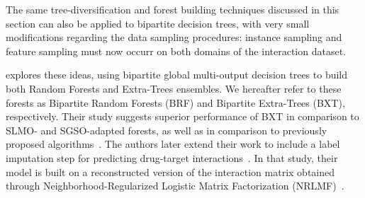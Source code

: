 The same tree-diversification and forest building techniques discussed in this section can also be applied to bipartite decision trees, with very small modifications regarding the data sampling procedures: instance sampling and feature sampling must now occurr on both domains of the interaction dataset.

\cite{pliakos2019network} explores these ideas, using bipartite global multi-output decision trees to build both Random Forests and Extra-Trees ensembles. We hereafter refer to these forests as Bipartite Random Forests (BRF) and Bipartite Extra-Trees (BXT), respectively. Their study suggests superior performance of BXT in comparison to SLMO- and SGSO-adapted forests, as well as in comparison to previously proposed algorithms~\cite{pliakos2019network}. %
%
The authors later extend their work to include a label imputation step for predicting drug-target interactions~\cite{pliakos2020drugtarget}. In that study, their model is built on a reconstructed version of the interaction matrix obtained through Neighborhood-Regularized Logistic Matrix Factorization (NRLMF)~\cite{liu2016neighborhood}.





